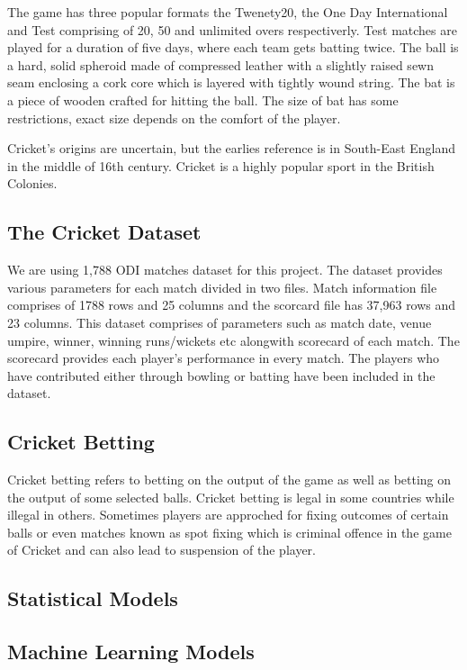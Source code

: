 \documentclass[fleqn,10pt]{wlscirep}
\begin{document}
The game has three popular formats the Twenety20, the One Day International and Test comprising of 20, 50 and unlimited overs respectiverly. Test matches are played for a
duration of five days, where each team gets batting twice.
The ball is a hard, solid spheroid made of compressed leather with a slightly raised sewn seam enclosing a cork core which is layered with tightly wound string. The bat is a
piece of wooden crafted for hitting the ball. The size of bat has some restrictions, exact size depends on the comfort of the player.

Cricket's origins are uncertain, but the earlies reference is in South-East England in the middle of 16th century. Cricket is a highly popular sport 
in the British Colonies.

\subsection{The Cricket Dataset}

We are using 1,788 ODI matches dataset for this project. The dataset provides various parameters for each match divided in two files.
Match information file comprises of 1788 rows and 25 columns and the scorcard file has 37,963 rows and 23 columns.
This dataset comprises of parameters such as match date, venue umpire, winner, winning runs/wickets etc alongwith scorecard of each match.
The scorecard provides each player's performance in every match. The players who have contributed either through bowling or batting have been included in the dataset.

\subsection{Cricket Betting}
Cricket betting refers to betting on the output of the game as well as betting on the output of some selected balls.
Cricket betting is legal in some countries while illegal in others. Sometimes players are approched for fixing outcomes of certain balls 
or even matches known as spot fixing which is criminal offence in the game of Cricket and can also lead to suspension of the player.
\subsection{Statistical Models}
\subsection{Machine Learning Models}
\end{document}
